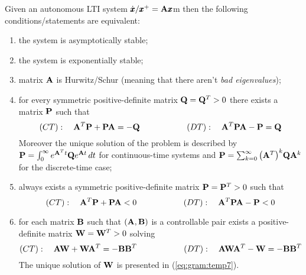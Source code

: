 	\begin{theorem}
		Given an autonomous LTI system $\dx/\xp = \A \x$m then the following conditions/statements are equivalent:
		\begin{enumerate}[\itshape i)]
			\item the system is asymptotically stable;
			\item the system is exponentially stable;
			\item matrix $\A$ is Hurwitz/Schur (meaning that there aren't \textit{bad eigenvalues});
			\item for every symmetric positive-definite matrix $\Q = \Q^T > 0$ there exists a matrix $\P$ such that
			\[ (CT): \quad \A^T \P + \P \A = - \Q \hspace{2cm} (DT): \quad \A^T\P\A - \P = \Q \]
			Moreover the unique solution of the problem is described by $\P = \int_0^\infty e^{\A^T t} \Q e^{\A t}\, dt$ for continuous-time systems and $\P = \sum_{k=0}^\infty \big(\A^T\big)^k \Q \A^k$ for the discrete-time case;
			\item always exists a symmetric positive-definite matrix $\P= \P^T > 0$ such that
			\[ (CT): \quad \A^T \P + \P \A < 0 \hspace{2cm} (DT): \quad \A^T\P\A - \P < 0 \]
			\item for each matrix $\B$ such that $(\A,\B)$ is a controllable pair exists a positive-definite matrix $\mat W = \mat W^T > 0$ solving
			\[ (CT):\quad \A \mat W + \mat W \A^T = - \B\B^T \hspace{2cm} (DT): \quad \A \mat W \A^T - \mat W = - \B \B^T \]
			The unique solution of $\mat W$ is presented in (\ref{eq:gram:temp7}).
		\end{enumerate}
	\end{theorem}
	
